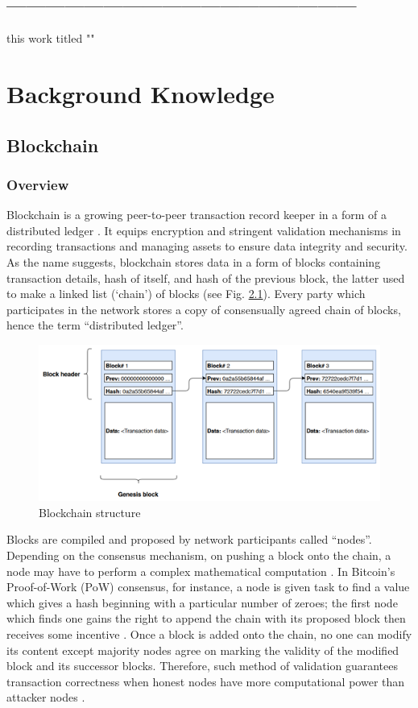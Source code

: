 \documentclass[a4paper,12pt,oneside, utf8x]{report}
\begin{document}
\section{------------------------------------------------------}
this work titled ""


\chapter{Background Knowledge}
\label{cbknowledge}

\section{Blockchain}
\subsection{Overview}
Blockchain is a growing peer-to-peer transaction record keeper in a form of a distributed ledger \cite{y43}. It equips encryption and stringent validation mechanisms in recording transactions and managing assets to ensure data integrity and security. As the name suggests, blockchain stores data in a form of blocks containing transaction details, hash of itself, and hash of the previous block, the latter used to make a linked list (‘chain’) of blocks (see Fig. \ref{f31}). Every party which participates in the network stores a copy of consensually agreed chain of blocks, hence the term ``distributed ledger''.

    \begin{figure}[H]
        \centering
        \includegraphics[width=.7\textwidth]{figures/3-1.png}
        \caption{Blockchain structure}
        \label{f31}
    \end{figure}
    
Blocks are compiled and proposed by network participants called ``nodes''. Depending on the consensus mechanism, on pushing a block onto the chain, a node may have to perform a complex mathematical computation \cite{y43}. In Bitcoin’s Proof-of-Work (PoW) consensus, for instance, a node is given task to find a value which gives a hash beginning with a particular number of zeroes; the first node which finds one gains the right to append the chain with its proposed block then receives some incentive \cite{s7}. Once a block is added onto the chain, no one can modify its content except majority nodes agree on marking the validity of the modified block and its successor blocks. Therefore, such method of validation guarantees transaction correctness when honest nodes have more computational power than attacker nodes \cite{y43}. 
\end{document}
